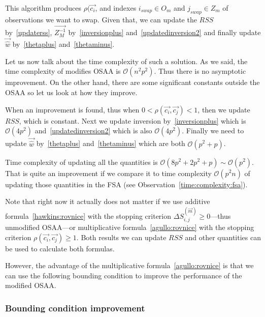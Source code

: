 This algorithm produces $\rho(\vec{c_i}$, and indexes  $i_{swap} \in O_m$ and $j_{swap} \in Z_m$ of observations we want to swap. Given that, we can update the $RSS$ by~\eqref{updaterss}, $\vec{Z_M^{-1}}$ by~\eqref{inversionplus} and~\eqref{updatedinversion2} and finally update $\vec{\hat{w}}$ by~\eqref{thetaplus} and~\eqref{thetaminus}.

Let us now talk about the time complexity of such a solution. As we said, the time complexity of modifies OSAA is $\mathcal{O}( n^2 p^2)$. Thus there is no asymptotic improvement. On the other hand, there are some significant constants outside the OSAA so let us look at how they improve.

When an improvement is found, thus when $0 < \rho(\vec{c_i}, \vec{c_j}) < 1 $, then we update $RSS$, which is constant. Next we update inversion by~\eqref{inversionplus} which is $\mathcal{O}(4p^2)$ and~\eqref{updatedinversion2} which is also $\mathcal{O}(4p^2)$.  Finally we need to update $\vec{\hat{w}}$ by~\eqref{thetaplus} and~\eqref{thetaminus} which are both $\mathcal{O}(p^2 +p)$. 

\begin{observation} \label{updatinginversionobservation}
Time complexity of updating all the quantities is 
$\mathcal{O}(8p^2 + 2p^2 + p) \sim \mathcal{O}(p^2)$.
That is quite an improvement if we compare it to time complexity $\mathcal{O}(p^2n)$ of updating those quantities in the FSA (see Observation~\ref{time:complexity:fsa}).
\end{observation}


Note that right now it actually does not matter if we use additive formula~\eqref{hawkins:rovnice} with the stopping criterion $\Delta S^{(\vec{m})}_{i,j} \geq 0$---thus unmodified OSAA---or multiplicative formula~\eqref{agullo:rovnice} with the stopping criterion $\rho(\vec{c_i}, \vec{c_j}) \geq 1 $. Both results we can update $RSS$ and other quantities can be used to calculate both formulas. 

However, the advantage of the multiplicative formula~\eqref{agullo:rovnice} is that we can use the following bounding condition to improve the performance of the modified OSAA.



\subsubsection*{Bounding condition improvement}

